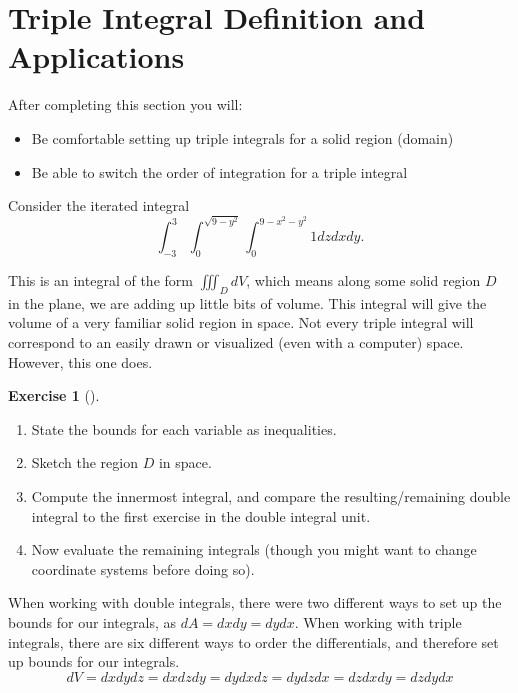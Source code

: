 \documentclass[10pt,]{book}
\theoremstyle{plain}
\theoremstyle{definition}
\theoremstyle{definition}
\theoremstyle{definition}
\theoremstyle{definition}
\newtheorem{exploration}[project]{Exercise}
\theoremstyle{definition}
\numberwithin{equation}{section}
\newcommand{\ds}{\displaystyle}
\begin{document}
\section[{Triple Integral Definition and Applications}]{Triple Integral Definition and Applications}\label{section-45}
After completing this section you will: \leavevmode%
\begin{itemize}[label=\textbullet]
\item{}Be comfortable setting up triple integrals for a solid region (domain)%
\item{}Be able to switch the order of integration for a triple integral%
\end{itemize}
%
\par
Consider the iterated integral%
\begin{equation*}
\ds \int_{-3}^3 \int_0^{\sqrt{9-y^2}}\int_0^{9-x^2-y^2} 1dzdxdy.
\end{equation*}
%
\par
This is an integral of the form \(\iiint_D dV\), which means along some solid region \(D\) in the plane, we are adding up little bits of volume. This integral will give the volume of a very familiar solid region in space. Not every triple integral will correspond to an easily drawn or visualized (even with a computer) space. However, this one does.%
\begin{exploration}[]\label{exploration-295}
\leavevmode%
\begin{enumerate}[font=\bfseries,label=(\alph*),ref=\alph*]
\item\label{task-807} State the bounds for each variable as inequalities.%
\item\label{task-808} Sketch the region \(D\) in space.%
\item\label{task-809} Compute the innermost integral, and compare the resulting/remaining double integral to the first exercise in the double integral unit.%
\item\label{task-810} Now evaluate the remaining integrals (though you might want to change coordinate systems before doing so).%
\end{enumerate}
\end{exploration}
When working with double integrals, there were two different ways to set up the bounds for our integrals, as \(dA=dxdy=dydx\). When working with triple integrals, there are six different ways to order the differentials, and therefore set up bounds for our integrals.%
\begin{equation*}
dV=dxdydz = dxdzdy = dydxdz=dydzdx=dzdxdy=dzdydx
\end{equation*}
\end{document}

